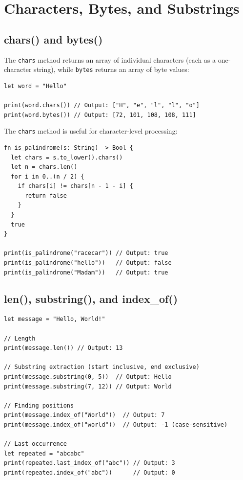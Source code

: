 \section{Characters, Bytes, and Substrings}\label{sec:chars-bytes}

\subsection{chars() and bytes()}\label{sec:chars-and-bytes}

The \lstinline|chars| method returns an array of individual characters (each as a one-character string), while \lstinline|bytes| returns an array of byte values:

\begin{lstlisting}[language=Lattice, caption={chars and bytes}]
let word = "Hello"

print(word.chars()) // Output: ["H", "e", "l", "l", "o"]
print(word.bytes()) // Output: [72, 101, 108, 108, 111]
\end{lstlisting}

The \lstinline|chars| method is useful for character-level processing:

\begin{lstlisting}[language=Lattice, caption={Character-level operations}]
fn is_palindrome(s: String) -> Bool {
  let chars = s.to_lower().chars()
  let n = chars.len()
  for i in 0..(n / 2) {
    if chars[i] != chars[n - 1 - i] {
      return false
    }
  }
  true
}

print(is_palindrome("racecar")) // Output: true
print(is_palindrome("hello"))   // Output: false
print(is_palindrome("Madam"))   // Output: true
\end{lstlisting}

\subsection{len(), substring(), and index\_of()}\label{sec:len-substring}

\begin{lstlisting}[language=Lattice, caption={String length, substrings, and searching}]
let message = "Hello, World!"

// Length
print(message.len()) // Output: 13

// Substring extraction (start inclusive, end exclusive)
print(message.substring(0, 5))  // Output: Hello
print(message.substring(7, 12)) // Output: World

// Finding positions
print(message.index_of("World"))  // Output: 7
print(message.index_of("world"))  // Output: -1 (case-sensitive)

// Last occurrence
let repeated = "abcabc"
print(repeated.last_index_of("abc")) // Output: 3
print(repeated.index_of("abc"))      // Output: 0
\end{lstlisting}

